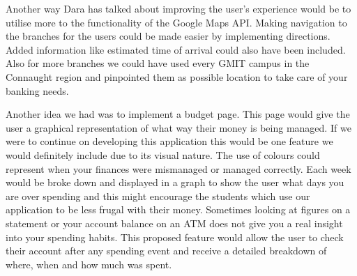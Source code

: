 Another way Dara has talked about improving the user’s experience would be to utilise more to the functionality of the Google Maps API. Making navigation to the branches for the users could be made easier by implementing directions. Added information like estimated time of arrival could also have been included. Also for more branches we could have used every GMIT campus in the Connaught region and pinpointed them as possible location to take care of your banking needs.

Another idea we had was to implement a budget page. This page would give the user a graphical representation of what way their money is being managed. If we were to continue on developing this application this would be one feature we would definitely include due to its visual nature. The use of colours could represent when your finances were mismanaged or managed correctly. Each week would be broke down and displayed in a graph to show the user what days you are over spending and this might encourage the students which use our application to be less frugal with their money. Sometimes looking at figures on a statement or your account balance on an ATM does not give you a real insight into your spending habits. This proposed feature would allow the user to check their account after any spending event and receive a detailed breakdown of where, when and how much was spent.
